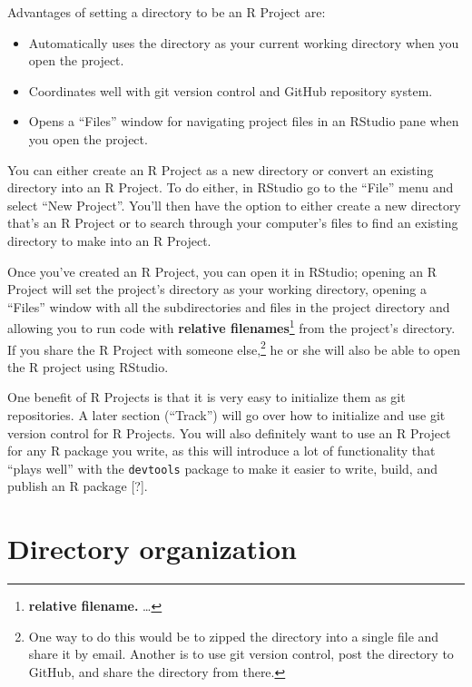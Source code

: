 \documentclass[]{tufte-book}
\providecommand{\tightlist}{%
  \setlength{\itemsep}{0pt}\setlength{\parskip}{0pt}}
\begin{document}
Advantages of setting a directory to be an R Project are:

\begin{itemize}
\tightlist
\item
  Automatically uses the directory as your current working directory when you open the project.
\item
  Coordinates well with git version control and GitHub repository system.
\item
  Opens a ``Files'' window for navigating project files in an RStudio pane when you open the project.
\end{itemize}

You can either create an R Project as a new directory or convert an existing directory into
an R Project. To do either, in RStudio go to the ``File'' menu and select ``New Project''. You'll
then have the option to either create a new directory that's an R Project or to search through
your computer's files to find an existing directory to make into an R Project.

Once you've created an R Project, you can open it in RStudio; opening an R Project will set
the project's directory as your working directory, opening a ``Files'' window with all the
subdirectories and files in the project directory and allowing you to run code with
\textbf{relative filenames}\footnote{\textbf{relative filename.} \ldots{}} from the project's directory. If you
share the R Project with someone else,\footnote{One way to do this would be to zipped the directory
  into a single file and share it by email. Another is to use git version control, post the
  directory to GitHub, and share the directory from there.} he or she will also be able to
open the R project using RStudio.

One benefit of R Projects is that it is very easy to initialize them as git repositories.
A later section (``Track'') will go over how to initialize and use git version control for
R Projects. You will also definitely want to use an R Project for any R package you write,
as this will introduce a lot of functionality that ``plays well'' with the \texttt{devtools} package
to make it easier to write, build, and publish an R package {[}?{]}.

\hypertarget{directory-organization}{%
\section{Directory organization}\label{directory-organization}}
\end{document}
